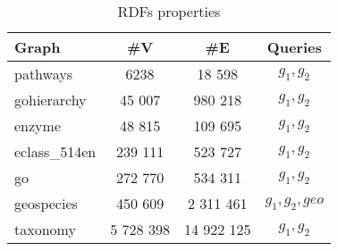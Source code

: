 {\setlength{\tabcolsep}{0.25em}
	\begin{table}
		{
			\caption{RDFs properties}
			\label{tbl:propRDF}
			\small
			\begin{tabular}{|l|c|c|c|}
				\hline
				Graph & \#V & \#E & Queries \\
				\hline
				\hline
				pathways               & 6238                 & 18 598               & $g_1, g_2$ \\
				gohierarchy            & 45 007               & 980 218              & $g_1, g_2$ \\
				enzyme                 & 48 815               & 109 695              & $g_1, g_2$ \\
				eclass\_514en          & 239 111              & 523 727              & $g_1, g_2$ \\
				go                     & 272 770              & 534 311              & $g_1, g_2$ \\
				geospecies             & 450 609              & 2 311 461            & $g_1, g_2, geo$  \\
				taxonomy                   & 5 728 398                 & 14 922 125                 & $g_1, g_2$ \\
				\hline
			\end{tabular}
		}
	\end{table}
}


